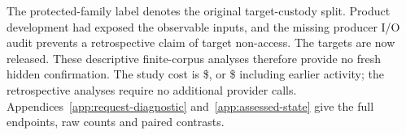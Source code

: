 The protected-family label denotes the original target-custody split.
Product development had exposed the observable inputs, and the missing
producer I/O audit prevents a retrospective claim of target non-access.
The targets are now released. These descriptive finite-corpus analyses
therefore provide no fresh hidden confirmation. The study cost is
\$\nrStudyCost, or \$\nrTotalCost{} including earlier activity; the
retrospective analyses require no additional provider calls.
Appendices~\ref{app:request-diagnostic} and~\ref{app:assessed-state} give
the full endpoints, raw counts and paired contrasts.
